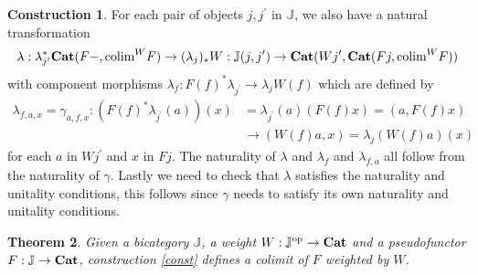 \documentclass[12pt,oneside,reqno,a4paper]{article}
\newtheorem{theorem}{Theorem}[section]
\theoremstyle{definition}
\newtheorem{construction}[theorem]{Construction}
\newcommand{\op}{^\textup{op}}
\newcommand{\Cat}{\textbf{\textup{Cat}}}
\newcommand{\bJ}{\mathbb{J}}
\newcommand{\p}{^\prime}
\newcommand{\colim}{\textup{colim}}
\begin{document}
\begin{construction}
For each pair of objects $j,j\p$ in $\bJ$, we also have a natural transformation
\begin{align*}
\lambda: \lambda_{j\p}^*\Cat(F-,\colim^W F)\to (\lambda_j)_*W:\bJ(j,j\p)\to \Cat(Wj\p,\Cat(Fj,\colim^W F))
\end{align*}
with component morphisms  $\lambda_f: F(f)^*\lambda_{j\p} \to \lambda_j W(f)$ which are defined by
\begin{align*}
\lambda_{f,a,x} =\gamma_{a,f,x}: \left(F(f)^*\lambda_{j\p}(a)\right)(x) & = \lambda_{j\p}(a)(F(f)x) = (a,F(f)x) \\
& \to (W(f)a,x)=\lambda_j(W(f)a)(x)
\end{align*}
for each $a$ in $Wj\p$ and $x$ in $Fj$. The naturality of $\lambda$ and $\lambda_f$ and $\lambda_{f,a}$ all follow from the naturality of $\gamma$. Lastly we need to check that $\lambda$ satisfies the naturality and unitality conditions, this follows since $\gamma$ needs to satisfy its own naturality and unitality conditions.
\end{construction}

\begin{theorem} \label{x1}
Given a bicategory $\bJ$, a weight $W:\bJ\op\to\Cat$ and a pseudofunctor $F:\bJ\to\Cat$, construction \ref{const} defines a colimit of $F$ weighted by $W$.
\end{theorem}
\end{document}
